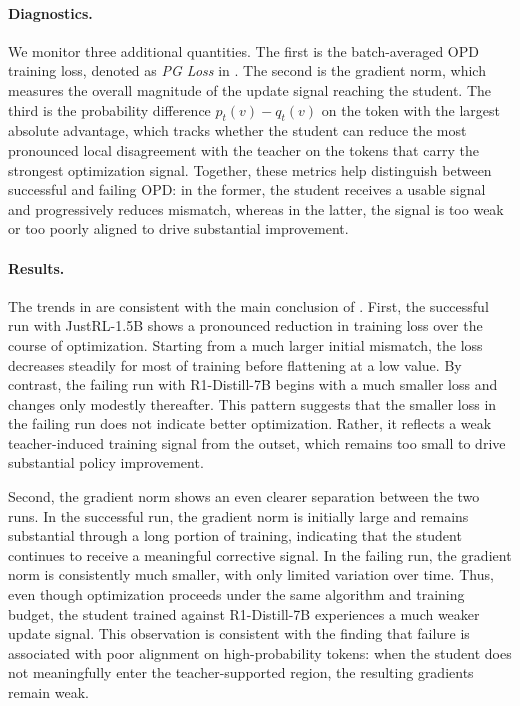\paragraph{Diagnostics.}
We monitor three additional quantities. The first is the batch-averaged OPD training loss, denoted as \emph{PG Loss} in . The second is the gradient norm, which measures the overall magnitude of the update signal reaching the student. The third is the probability difference $p_t(v)-q_t(v)$ on the token with the largest absolute advantage, which tracks whether the student can reduce the most pronounced local disagreement with the teacher on the tokens that carry the strongest optimization signal. Together, these metrics help distinguish between successful and failing OPD: in the former, the student receives a usable signal and progressively reduces mismatch, whereas in the latter, the signal is too weak or too poorly aligned to drive substantial improvement.

\paragraph{Results.}
The trends in  are consistent with the main conclusion of . First, the successful run with JustRL-1.5B shows a pronounced reduction in training loss over the course of optimization. Starting from a much larger initial mismatch, the loss decreases steadily for most of training before flattening at a low value. By contrast, the failing run with R1-Distill-7B begins with a much smaller loss and changes only modestly thereafter. This pattern suggests that the smaller loss in the failing run does not indicate better optimization. Rather, it reflects a weak teacher-induced training signal from the outset, which remains too small to drive substantial policy improvement.

Second, the gradient norm shows an even clearer separation between the two runs. In the successful run, the gradient norm is initially large and remains substantial through a long portion of training, indicating that the student continues to receive a meaningful corrective signal. In the failing run, the gradient norm is consistently much smaller, with only limited variation over time. Thus, even though optimization proceeds under the same algorithm and training budget, the student trained against R1-Distill-7B experiences a much weaker update signal. This observation is consistent with the finding that failure is associated with poor alignment on high-probability tokens: when the student does not meaningfully enter the teacher-supported region, the resulting gradients remain weak.

